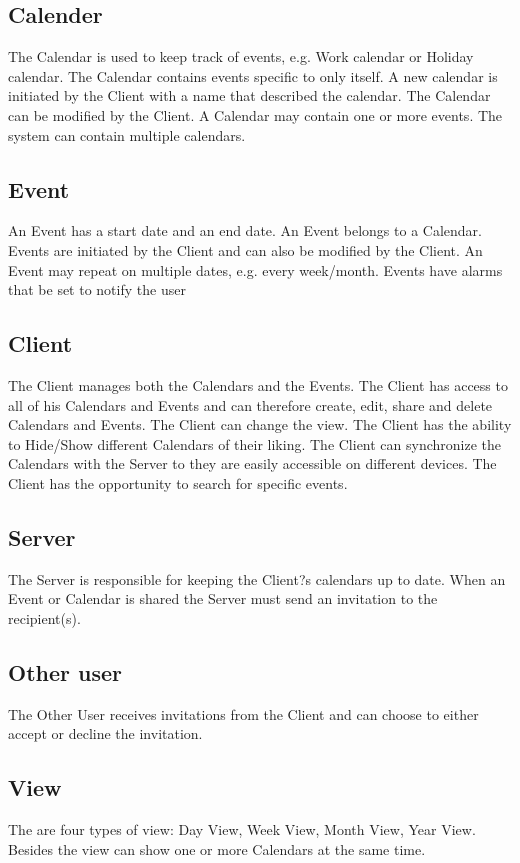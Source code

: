 \subsection*{Calender}
The Calendar is used to keep track of events, e.g. Work calendar or Holiday calendar. The Calendar contains events specific to only itself.
A new calendar is initiated by the Client with a name that described the calendar. The Calendar can be modified by the Client.
 A Calendar may contain one or more events. The system can contain multiple calendars.

\subsection*{Event}
An Event has a start date and an end date.
An Event belongs to a Calendar. Events are initiated by the Client and can also be modified by the Client.
An Event may repeat on multiple dates, e.g. every week/month.
Events have alarms that be set to notify the user

\subsection*{Client}
The Client manages both the Calendars and the Events.
The Client has access to all of his Calendars and Events and can therefore create, edit, share and delete Calendars and Events.
The Client can change the view.
The Client has the ability to Hide/Show different Calendars of their liking.
The Client can synchronize the Calendars with the Server to they are easily accessible on different devices.
The Client has the opportunity to search for specific events.

\subsection*{Server}
The Server is responsible for keeping the Client?s calendars up to date.
When an Event or Calendar is shared the Server must send an invitation to the recipient(s).

\subsection*{Other user}
The Other User receives invitations from the Client and can choose to either accept or decline the invitation.

\subsection*{View}
The are four types of view: Day View, Week View, Month View, Year View.
Besides the view can show one or more Calendars at the same time.